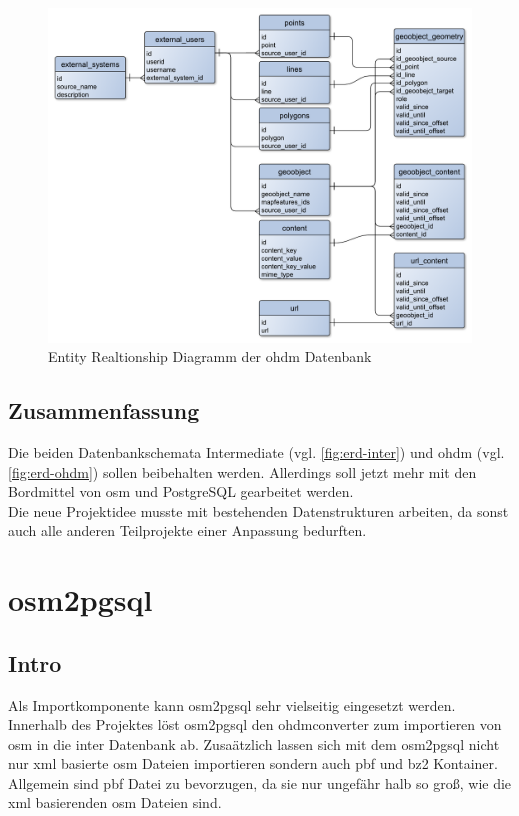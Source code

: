\begin{figure}[h]
	\caption{Entity Realtionship Diagramm der \gls{ohdm} Datenbank}
	\label{fig:erd-ohdm}
	\includegraphics[width=\linewidth]{img/ohdm-db-erd.pdf}
\end{figure}

\section{Zusammenfassung}
Die beiden Datenbankschemata Intermediate (vgl. \autoref{fig:erd-inter}) und \gls{ohdm} (vgl. \autoref{fig:erd-ohdm}) sollen beibehalten werden. Allerdings soll jetzt mehr mit den Bordmittel von \gls{osm} und PostgreSQL gearbeitet werden.\\

Die neue Projektidee musste mit bestehenden Datenstrukturen arbeiten, da sonst auch alle anderen Teilprojekte einer Anpassung bedurften.

\chapter{osm2pgsql}
\section{Intro}
Als Importkomponente kann osm2pgsql\cite{osm2pgsql-manual} sehr vielseitig eingesetzt werden. Innerhalb des Projektes löst osm2pgsql den \gls{ohdmconverter} zum importieren von \gls{osm} in die \gls{inter} Datenbank ab. Zusaätzlich lassen sich mit dem osm2pgsql nicht nur xml basierte \gls{osm} Dateien importieren sondern auch pbf und bz2 Kontainer. Allgemein sind \gls{pbf} Datei zu bevorzugen, da sie nur ungefähr halb so groß, wie die xml basierenden \gls{osm} Dateien sind.\cite{osm:pbf}\\

